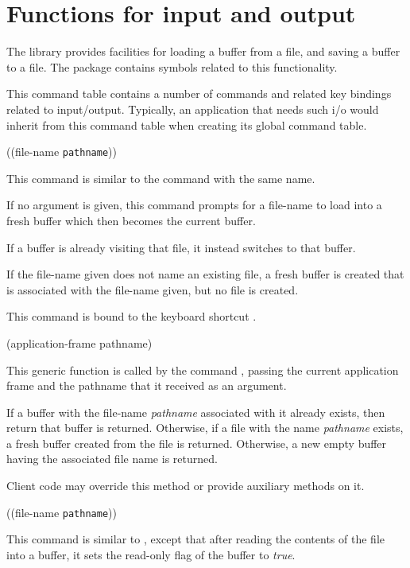 \chapter{Functions for input and output}

The \sysname{} library provides facilities for loading a buffer from a
file, and saving a buffer to a file.  The  package
contains symbols related to this functionality.


This command table contains a number of commands and related key
bindings related to input/output.  Typically, an application that
needs such i/o would inherit from this command table when creating its
global command table.

 {((file-name \texttt{pathname}))}

This command is similar to the \emacs{} command with the same name.

If no argument is given, this command prompts for a file-name to load
into a fresh buffer which then becomes the current buffer.

If a buffer is already visiting that file, it instead switches to that
buffer.

If the file-name given does not name an existing file, a fresh buffer
is created that is associated with the file-name given, but no file is
created.

This command is bound to the keyboard shortcut .

 {(application-frame pathname)}

This generic function is called by the command
, passing the current application frame and the
pathname that it received as an argument.

If a buffer with the file-name \textit{pathname} associated with it
already exists, then return that buffer is returned.  Otherwise, if a
file with the name \textit{pathname} exists, a fresh buffer created
from the file is returned.  Otherwise, a new empty buffer having the
associated file name is returned.

Client code may override this method or provide auxiliary methods on
it.

 {((file-name \texttt{pathname}))}

This command is similar to , except that after
reading the contents of the file into a buffer, it sets the read-only
flag of the buffer to \emph{true}.


